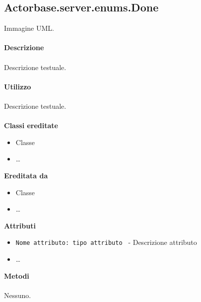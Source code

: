 \documentclass[a4paper]{article}
\begin{document}
	\subsection{Actorbase.server.enums.Done}
		Immagine UML.
		\\ \\
		\textbf{Descrizione}
			\\ \\
			Descrizione testuale.
			\\ \\
		\textbf{Utilizzo}
			\\ \\
			Descrizione testuale.
			\\ \\
		\textbf{Classi ereditate}
			\begin{itemize}
				\item Classe
				\item \dots
			\end{itemize}
		\textbf{Ereditata da}
			\begin{itemize}
				\item Classe
				\item \dots
			\end{itemize}
		\textbf{Attributi}
			\begin{itemize}
				\item \texttt{Nome attributo: tipo attributo } - Descrizione attributo
				\item \dots
			\end{itemize}
		\textbf{Metodi}
			\\ \\
			Nessuno.
			
\end{document}
